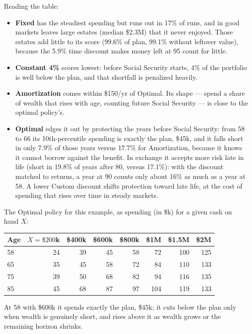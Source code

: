 \documentclass[11pt,letterpaper]{article}
\begin{document}
\noindent Reading the table:
\begin{itemize}
\setlength\itemsep{1pt}
\item \textbf{Fixed} has the steadiest spending but runs out in 17\% of runs, and in good markets leaves large estates (median \$2.3M) that it never enjoyed. Those estates add little to its score (99.6\% of plan, 99.1\% without leftover value), because the 5.9\% time discount makes money left at 95 count for little.
\item \textbf{Constant 4\%} scores lowest: before Social Security starts, 4\% of the portfolio is well below the plan, and that shortfall is penalized heavily.
\item \textbf{Amortization} comes within \$150/yr of Optimal. Its shape --- spend a share of wealth that rises with age, counting future Social Security --- is close to the optimal policy's.
\item \textbf{Optimal} edges it out by protecting the years before Social Security: from 58 to 66 its 10th-percentile spending is exactly the plan, \$45k, and it falls short in only 7.9\% of those years versus 17.7\% for Amortization, because it knows it cannot borrow against the benefit. In exchange it accepts more risk late in life (short in 19.8\% of years after 80, versus 17.1\%): with the discount matched to returns, a year at 90 counts only about 16\% as much as a year at 58. A lower Custom discount shifts protection toward late life, at the cost of spending that rises over time in steady markets.
\end{itemize}

\noindent The Optimal policy for this example, as spending (in \$k) for a given cash on hand $X$:
\begin{center}
\begin{tabular}{@{}lrrrrrrr@{}}
\toprule
Age & $X=\$200$k & \$400k & \$600k & \$800k & \$1M & \$1.5M & \$2M \\
\midrule
58 & 24 & 39 & 45 & 58 & 72 & 100 & 125 \\
65 & 35 & 45 & 58 & 72 & 84 & 110 & 133 \\
75 & 39 & 50 & 68 & 82 & 94 & 116 & 135 \\
85 & 45 & 68 & 87 & 97 & 104 & 119 & 133 \\
\bottomrule
\end{tabular}
\end{center}
At 58 with \$600k it spends exactly the plan, \$45k; it cuts below the plan only when wealth is genuinely short, and rises above it as wealth grows or the remaining horizon shrinks.
\end{document}
